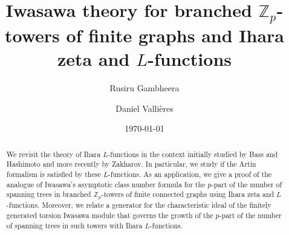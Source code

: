 \documentclass[11pt]{amsart}
\numberwithin{equation}{section}
\theoremstyle{remark}
\theoremstyle{definition}
\begin{document}
\title[Iwasawa theory for graphs and Ihara zeta and $L$-functions]{Iwasawa theory for branched $\mathbb{Z}_{p}$-towers of finite graphs and Ihara zeta and $L$-functions}


\author[R.~Gambheera]{Rusiru Gambheera}
\address{Rusiru Gambheera\newline Department of Mathematics, University of California Santa Barbara, CA 93106-3080, USA}


\author[D.~Valli\`{e}res]{Daniel Valli\`{e}res}
\address{Daniel Valli\`{e}res\newline Mathematics and Statistics Department, California State University, Chico, CA 95929, USA}


\begin{abstract}
We revisit the theory of Ihara $L$-functions in the context initially studied by Bass and Hashimoto and more recently by Zakharov.  In particular, we study if the Artin formalism is satisfied by these $L$-functions.  As an application, we give a proof of the analogue of Iwasawa's asymptotic class number formula for the $p$-part of the number of spanning trees in branched $\mathbb{Z}_{p}$-towers of finite connected graphs using Ihara zeta and $L$-functions.  Moreover, we relate a generator for the characteristic ideal of the finitely generated torsion Iwasawa module that governs the growth of the $p$-part of the number of spanning trees in such towers with Ihara $L$-functions.
\end{abstract}

\date{\today} 


\maketitle

\tableofcontents 
\end{document}
